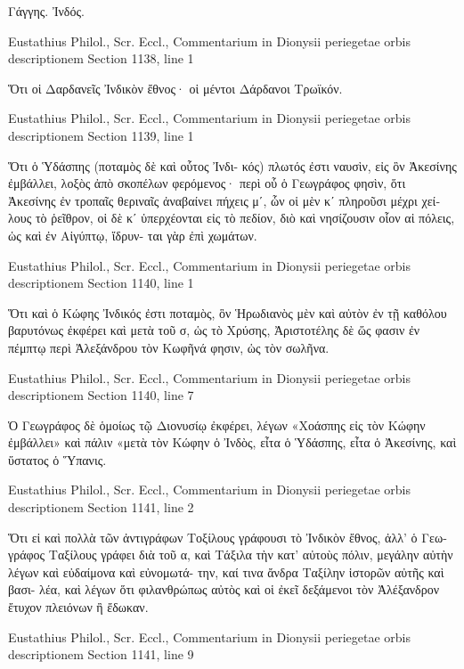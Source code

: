 \documentclass[12pt,letterpaper,twoside,final]{memoir}
\begin{document}
\begin{greek}
              Γάγγης. 
Ἰνδός. 



Eustathius Philol., Scr. Eccl., Commentarium in Dionysii periegetae orbis descriptionem 
Section 1138, line 1

Ὅτι οἱ Δαρδανεῖς Ἰνδικὸν ἔθνος· οἱ μέντοι 
Δάρδανοι Τρωϊκόν. 



Eustathius Philol., Scr. Eccl., Commentarium in Dionysii periegetae orbis descriptionem 
Section 1139, line 1

Ὅτι ὁ Ὑδάσπης (ποταμὸς δὲ καὶ οὗτος Ἰνδι-
κός) πλωτός ἐστι ναυσὶν, εἰς ὃν Ἀκεσίνης ἐμβάλλει, 
λοξὸς ἀπὸ σκοπέλων φερόμενος· περὶ οὗ ὁ Γεωγράφος 
φησὶν, ὅτι Ἀκεσίνης ἐν τροπαῖς θεριναῖς ἀναβαίνει 
πήχεις μʹ, ὧν οἱ μὲν κʹ πληροῦσι μέχρι χείλους τὸ 
ῥεῖθρον, οἱ δὲ κʹ ὑπερχέονται εἰς τὸ πεδίον, διὸ καὶ 
νησίζουσιν οἷον αἱ πόλεις, ὡς καὶ ἐν Αἰγύπτῳ, ἵδρυν-
ται γὰρ ἐπὶ χωμάτων. 



Eustathius Philol., Scr. Eccl., Commentarium in Dionysii periegetae orbis descriptionem 
Section 1140, line 1

Ὅτι καὶ ὁ Κώφης Ἰνδικός ἐστι ποταμὸς, ὃν 
Ἡρωδιανὸς μὲν καὶ αὐτὸν ἐν τῇ καθόλου βαρυτόνως 
ἐκφέρει καὶ μετὰ τοῦ σ, ὡς τὸ Χρύσης, Ἀριστοτέλης 
δὲ ὥς φασιν ἐν πέμπτῳ περὶ Ἀλεξάνδρου τὸν Κωφῆνά 
φησιν, ὡς τὸν σωλῆνα. 



Eustathius Philol., Scr. Eccl., Commentarium in Dionysii periegetae orbis descriptionem 
Section 1140, line 7

                         Ὁ Γεωγράφος δὲ ὁμοίως τῷ 
Διονυσίῳ ἐκφέρει, λέγων «Χοάσπης εἰς τὸν Κώφην 
ἐμβάλλει» καὶ πάλιν «μετὰ τὸν Κώφην ὁ Ἰνδὸς, εἶτα 
ὁ Ὑδάσπης, εἶτα ὁ Ἀκεσίνης, καὶ ὕστατος ὁ Ὕπανις. 



Eustathius Philol., Scr. Eccl., Commentarium in Dionysii periegetae orbis descriptionem 
Section 1141, line 2

Ὅτι εἰ καὶ πολλὰ τῶν ἀντιγράφων Τοξίλους 
γράφουσι τὸ Ἰνδικὸν ἔθνος, ἀλλ' ὁ Γεωγράφος Ταξίλους 
γράφει διὰ τοῦ α, καὶ Τάξιλα τὴν κατ' αὐτοὺς πόλιν, 
μεγάλην αὐτὴν λέγων καὶ εὐδαίμονα καὶ εὐνομωτά-
την, καί τινα ἄνδρα Ταξίλην ἱστορῶν αὐτῆς καὶ βασι-
λέα, καὶ λέγων ὅτι φιλανθρώπως αὐτὸς καὶ οἱ ἐκεῖ 
δεξάμενοι τὸν Ἀλέξανδρον ἔτυχον πλειόνων ἢ ἔδωκαν. 



Eustathius Philol., Scr. Eccl., Commentarium in Dionysii periegetae orbis descriptionem 
Section 1141, line 9


\end{greek}
\end{document}
